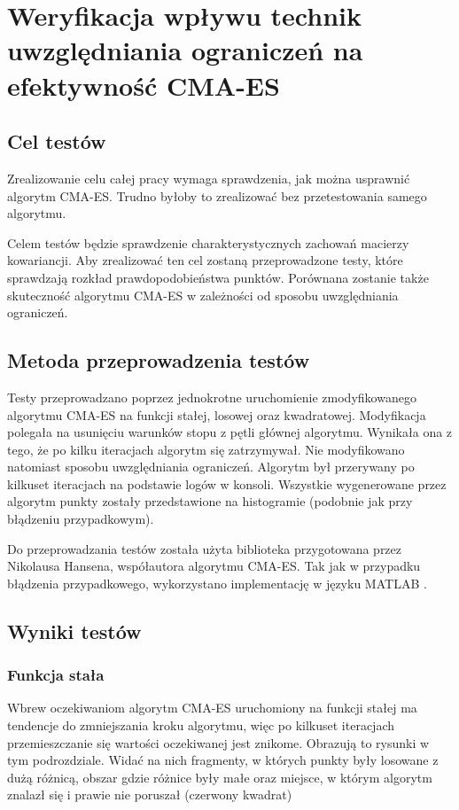 \documentclass{mini}
\newcommand{\CMAES}{\mbox{CMA-ES}}
\begin{document}
\pagebreak

\section{Weryfikacja wpływu technik uwzględniania ograniczeń na efektywność CMA-ES}

\subsection{Cel testów}
Zrealizowanie celu całej pracy wymaga sprawdzenia, jak można usprawnić algorytm \CMAES. Trudno byłoby to zrealizować bez przetestowania samego algorytmu.

Celem testów będzie sprawdzenie charakterystycznych zachowań macierzy kowariancji. Aby zrealizować ten cel zostaną przeprowadzone testy, które sprawdzają rozkład prawdopodobieństwa punktów. Porównana zostanie także skuteczność algorytmu CMA-ES w zależności od sposobu uwzględniania ograniczeń.

\subsection{Metoda przeprowadzenia testów}
Testy przeprowadzano poprzez jednokrotne uruchomienie zmodyfikowanego algorytmu CMA-ES na funkcji stałej, losowej oraz kwadratowej. Modyfikacja polegała na usunięciu warunków stopu z pętli głównej algorytmu. Wynikała ona z tego, że po kilku iteracjach algorytm się zatrzymywał. Nie modyfikowano natomiast sposobu uwzględniania ograniczeń. Algorytm był przerywany po kilkuset iteracjach na podstawie logów w konsoli. Wszystkie wygenerowane przez algorytm punkty zostały przedstawione na histogramie (podobnie jak przy błądzeniu przypadkowym).

Do przeprowadzania testów została użyta biblioteka przygotowana przez Nikolausa Hansena, współautora algorytmu CMA-ES. Tak jak w przypadku błądzenia przypadkowego, wykorzystano implementację w języku MATLAB \cite{cmaes_code}.

\subsection{Wyniki testów}

\subsubsection*{Funkcja stała}
Wbrew oczekiwaniom algorytm CMA-ES uruchomiony na funkcji stałej ma tendencje do zmniejszania kroku algorytmu, więc po kilkuset iteracjach przemieszczanie się wartości oczekiwanej jest znikome. Obrazują to rysunki w tym podrozdziale. Widać na nich fragmenty, w których punkty były losowane z dużą różnicą, obszar gdzie różnice były małe oraz miejsce, w którym algorytm znalazł się i prawie nie poruszał (czerwony kwadrat)
\end{document}
